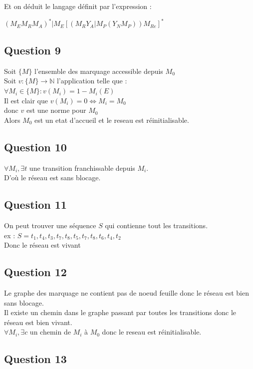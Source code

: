 Et on déduit le langage définit par l'expression :\\
\begin{center}
$(M_EM_RM_A)^*|M_E[(M_RY_A|M_P(Y_NM_P))M_{Re}]^*$
\end{center}

\subsection{Question 9}

Soit $\{M\}$ l'ensemble des marquage accessible depuis $M_0$\\
Soit $v : \{M\} \rightarrow \mathbb{N}$ l'application telle que :\\
$\forall M_i \in \{M\} : v(M_i) = 1-M_i(E)$\\
Il est clair que $v(M_i) = 0 \Leftrightarrow M_i = M_0$\\
\vspace{0.5cm}
donc $v$ est une norme pour $M_0$ \\
Alors $M_0$ est un etat d'accueil et le reseau est réinitialisable.


\subsection{Question 10}
$\forall M_i, \exists t$ une transition franchissable depuis $M_i$.\\
D'où le réseau est sans blocage.

\subsection{Question 11}

On peut trouver une séquence $S$ qui contienne tout les transitions.\\
ex : $S = t_1,t_4,t_3,t_7,t_8,t_5,t_7,t_8,t_6,t_4,t_2$\\
Donc le réseau est vivant

\subsection{Question 12}
Le graphe des marquage ne contient pas de noeud feuille donc le réseau est bien sans blocage.\\
Il existe un chemin dans le graphe passant par toutes les transitions donc le réseau est bien vivant.\\
$\forall M_i, \exists c$ un chemin de $M_i$ à $M_0$ donc le reseau est réinitialisable.

\subsection{Question 13}

\newpage
